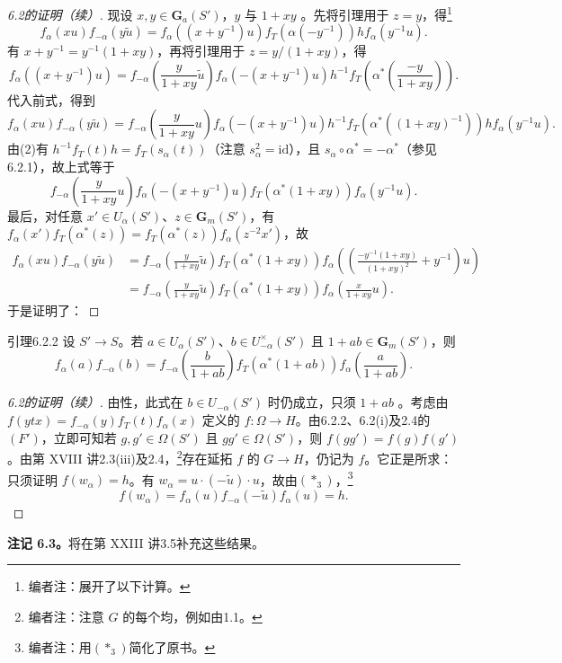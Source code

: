 \begin{proof}[6.2的证明（续）]
现设 $x,y\in\mathbf G_a(S')$，$y$ 与 $1+xy$ 。先将引理用于 $z=y$，得\footnote{编者注：展开了以下计算。}
\[f_\alpha(xu)f_{-\alpha}(y\widetilde u)=f_\alpha((x+y^{-1})u)f_T(\alpha(-y^{-1}))hf_\alpha(y^{-1}u).\]
有 $x+y^{-1}=y^{-1}(1+xy)$，再将引理用于 $z=y/(1+xy)$，得
\[f_\alpha((x+y^{-1})u)=f_{-\alpha}\left(\frac y{1+xy}\widetilde u\right)f_\alpha(-(x+y^{-1})u)h^{-1}f_T\left(\alpha^*\left(\frac{-y}{1+xy}\right)\right).\]
代入前式，得到
\[f_\alpha(xu)f_{-\alpha}(y\widetilde u)=f_{-\alpha}\left(\frac y{1+xy}u\right)f_\alpha(-(x+y^{-1})u)h^{-1}f_T(\alpha^*((1+xy)^{-1}))hf_\alpha(y^{-1}u).\]
由(2)有 $h^{-1}f_T(t)h=f_T(s_\alpha(t))$（注意 $s_\alpha^2=\mathrm{id}$），且 $s_\alpha\circ\alpha^*=-\alpha^*$（参见6.2.1），故上式等于
\[f_{-\alpha}\left(\frac y{1+xy}u\right)f_\alpha(-(x+y^{-1})u)f_T(\alpha^*(1+xy))f_\alpha(y^{-1}u).\]
最后，对任意 $x'\in U_\alpha(S')$、$z\in\mathbf G_m(S')$，有 $f_\alpha(x')f_T(\alpha^*(z))=f_T(\alpha^*(z))f_\alpha(z^{-2}x')$，故
\[\begin{aligned}f_\alpha(xu)f_{-\alpha}(y\widetilde u)&=f_{-\alpha}\left(\frac y{1+xy}\widetilde u\right)f_T(\alpha^*(1+xy))f_\alpha\left(\left(\frac{-y^{-1}(1+xy)}{(1+xy)^2}+y^{-1}\right)u\right)\\&=f_{-\alpha}\left(\frac y{1+xy}\widetilde u\right)f_T(\alpha^*(1+xy))f_\alpha\left(\frac x{1+xy}u\right).\end{aligned}\]
于是证明了：
\end{proof}
\begin{SGAresult}{引理}{6.2.2}
设 $S'\to S$。若 $a\in U_\alpha(S')$、$b\in U_{-\alpha}^\times(S')$ 且 $1+ab\in\mathbf G_m(S')$，则
\[f_\alpha(a)f_{-\alpha}(b)=f_{-\alpha}\left(\frac b{1+ab}\right)f_T(\alpha^*(1+ab))f_\alpha\left(\frac a{1+ab}\right).\]
\end{SGAresult}
\begin{proof}[6.2的证明（续）]
由性，此式在 $b\in U_{-\alpha}(S')$ 时仍成立，只须 $1+ab$ 。考虑由 $f(ytx)=f_{-\alpha}(y)f_T(t)f_\alpha(x)$ 定义的 $f:\Omega\to H$。由6.2.2、6.2(i)及2.4的$(F')$，立即可知若 $g,g'\in\Omega(S')$ 且 $gg'\in\Omega(S')$，则 $f(gg')=f(g)f(g')$。由第 XVIII 讲2.3(iii)及2.4，\footnote{编者注：注意 $G$ 的每个均，例如由1.1。}存在延拓 $f$ 的 $G\to H$，仍记为 $f$。它正是所求：只须证明 $f(w_\alpha)=h$。有 $w_\alpha=u\cdot(-\widetilde u)\cdot u$，故由$(*_3)$，\footnote{编者注：用$(*_3)$简化了原书。}
\[f(w_\alpha)=f_\alpha(u)f_{-\alpha}(-\widetilde u)f_\alpha(u)=h.\]
\end{proof}
\textbf{注记 6.3。}将在第 XXIII 讲3.5补充这些结果。
